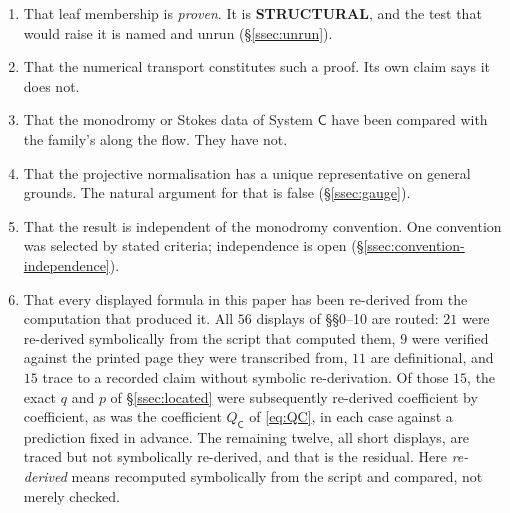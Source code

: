 \begin{enumerate}
\item That leaf membership is \emph{proven}. It is \textbf{STRUCTURAL}, and the
  test that would raise it is named and unrun (\S\ref{ssec:unrun}).
\item That the numerical transport constitutes such a proof. Its own claim says
  it does not.
\item That the monodromy or Stokes data of System $\mathsf C$ have been
  compared with the family's along the flow. They have not.
\item That the projective normalisation has a unique representative on general
  grounds. The natural argument for that is false
  (\S\ref{ssec:gauge}).
\item That the result is independent of the monodromy convention. One
  convention was selected by stated criteria; independence is open
  (\S\ref{ssec:convention-independence}).
\item That every displayed formula in this paper has been re-derived from the
  computation that produced it. All $56$ displays of \S\S0--10 are routed:
  $21$ were re-derived symbolically from the script that computed them, $9$
  were verified against the printed page they were transcribed from, $11$ are
  definitional, and $15$ trace to a recorded claim without symbolic
  re-derivation. Of those $15$, the exact $q$ and $p$ of
  \S\ref{ssec:located} were subsequently re-derived coefficient by
  coefficient, as was the coefficient $Q_{\mathsf C}$ of
  \eqref{eq:QC}, in each case against a prediction fixed in advance. The
  remaining twelve, all short displays, are traced but not symbolically
  re-derived, and that is the residual. Here \emph{re-derived} means
  recomputed symbolically from the script and compared, not merely checked.
\end{enumerate}
